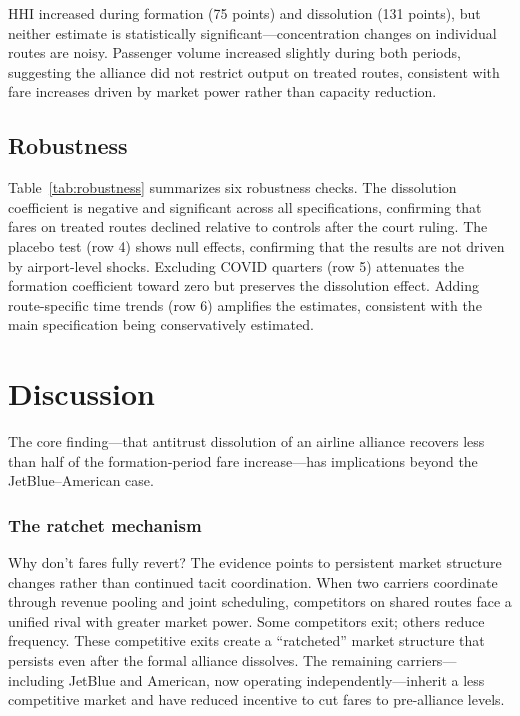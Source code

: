 \documentclass[12pt]{article}
\begin{document}
HHI increased during formation (75 points) and dissolution (131 points), but neither estimate is statistically significant---concentration changes on individual routes are noisy. Passenger volume increased slightly during both periods, suggesting the alliance did not restrict output on treated routes, consistent with fare increases driven by market power rather than capacity reduction.

\subsection{Robustness}



Table~\ref{tab:robustness} summarizes six robustness checks. The dissolution coefficient is negative and significant across all specifications, confirming that fares on treated routes declined relative to controls after the court ruling. The placebo test (row 4) shows null effects, confirming that the results are not driven by airport-level shocks. Excluding COVID quarters (row 5) attenuates the formation coefficient toward zero but preserves the dissolution effect. Adding route-specific time trends (row 6) amplifies the estimates, consistent with the main specification being conservatively estimated.


\section{Discussion}

The core finding---that antitrust dissolution of an airline alliance recovers less than half of the formation-period fare increase---has implications beyond the JetBlue--American case.

\subsubsection*{The ratchet mechanism} Why don't fares fully revert? The evidence points to persistent market structure changes rather than continued tacit coordination. When two carriers coordinate through revenue pooling and joint scheduling, competitors on shared routes face a unified rival with greater market power. Some competitors exit; others reduce frequency. These competitive exits create a ``ratcheted'' market structure that persists even after the formal alliance dissolves. The remaining carriers---including JetBlue and American, now operating independently---inherit a less competitive market and have reduced incentive to cut fares to pre-alliance levels.
\end{document}
